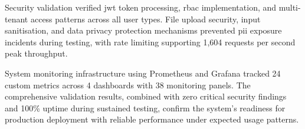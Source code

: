 Security validation verified \ac{jwt} token processing, \ac{rbac} implementation, and multi-tenant access patterns across all user types. File upload security, input sanitisation, and data privacy protection mechanisms prevented \ac{pii} exposure incidents during testing, with rate limiting supporting 1,604 requests per second peak throughput.

System monitoring infrastructure using Prometheus and Grafana tracked 24 custom metrics across 4 dashboards with 38 monitoring panels. The comprehensive validation results, combined with zero critical security findings and 100\% uptime during sustained testing, confirm the system's readiness for production deployment with reliable performance under expected usage patterns.
